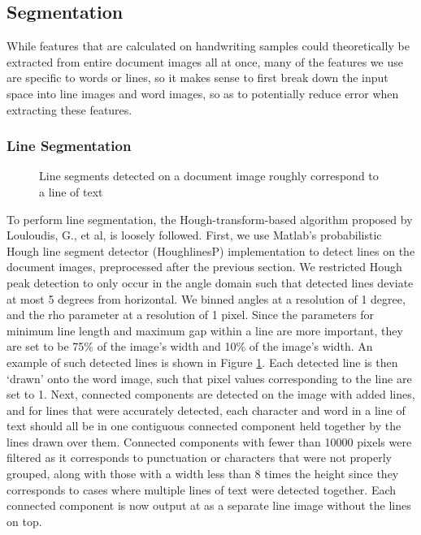 \documentclass[paper=a4, fontsize=11pt]{scrartcl} %
\numberwithin{equation}{section} %
\numberwithin{figure}{section} %
\numberwithin{table}{section} %
\begin{document}
\subsection{Segmentation}
While features that are calculated on handwriting samples could theoretically be extracted from entire document images all at once, many of the features we use are specific to words or lines, so it makes sense to first break down the input space into line images and word images, so as to potentially reduce error when extracting these features. 

\subsubsection{Line Segmentation}

\begin{figure}
  \caption{Line segments detected on a document image roughly
    correspond to a line of text}
\label{fig:houghLineDetect}
\end{figure}

To perform line segmentation, the Hough-transform-based algorithm
proposed by Louloudis, G., et al, \cite{BlockBased} is loosely
followed. First, we use Matlab's probabilistic Hough line segment
detector (HoughlinesP) implementation to detect lines on the document
images, preprocessed after the previous section. We restricted Hough
peak detection to only occur in the angle domain such that detected
lines deviate at most 5 degrees from horizontal. We binned angles at a
resolution of 1 degree, and the rho parameter at a resolution of 1
pixel. Since the parameters for minimum line length and maximum gap within a line are more important, they are set to be 75\% of the image's width
and 10\% of the image's width. An example of such detected lines is
shown in Figure \ref{fig:houghLineDetect}. Each detected line is then ‘drawn’ onto the word image, such that pixel values corresponding to the line are set to 1. Next, connected components are detected on the image with added lines, and for lines that were accurately detected, each character and word in a line of text should all be in one contiguous connected component held together by the lines drawn over them. Connected components with fewer than 10000 pixels were filtered as it corresponds to punctuation or characters that were not properly grouped, along with  those with a width less than 8 times the height since they corresponds to cases where multiple lines of text were detected together. Each connected component is now output at as a separate line image without the lines on top.
\end{document}
